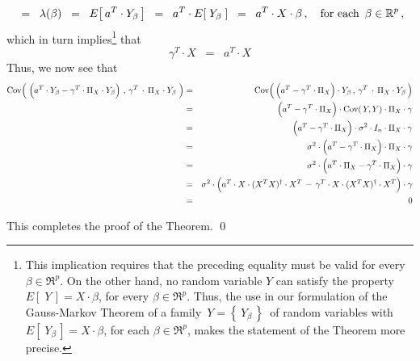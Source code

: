 \begin{enumerate}
\begin{equation*}
	\;\; = \;\;
		\lambda(\beta)
	\;\; = \;\;
		E\!\left[\,a^{T} \cdot Y_{\beta}\,\right]
	\;\; = \;\;
		a^{T} \cdot E\!\left[\;Y_{\beta}\;\right]
	\;\; = \;\;
		a^{T} \cdot X \cdot \beta\,,
	\quad
	\textnormal{for each \,$\beta \in \Re^{p}$}\,,
	\end{equation*}
	which in turn implies{\color{red}\footnote{\color{red}This implication
	requires that the preceding equality must be valid
	for every $\beta \in \Re^{p}$.
	On the other hand, no random variable $Y$ can satisfy the property
	$E\!\left[\;Y\,\right] = X \cdot \beta$, for every $\beta \in \Re^{p}$.
	Thus, the use in our formulation of the Gauss-Markov Theorem
	of a family \,$Y = \left\{\,Y_{\beta}\,\right\}$\, of random variables
	with $E\!\left[\;Y_{\beta}\,\right] = X \cdot \beta$, for each $\beta \in \Re^{p}$,
	makes the statement of the Theorem more precise.}}
	that
	\begin{equation*}
	\gamma^{T} \cdot X
	\;\; = \;\;
		a^{T} \cdot X
	\end{equation*}
	Thus, we now see that
	\begin{eqnarray*}
	\Cov\!\left(\;
		\left(a^{T} \cdot Y_{\beta}
		\overset{{\color{white}.}}{-}
		\gamma^{T} \cdot \Pi_{X} \cdot Y_{\beta}\right)
		\,,\,
		\gamma^{T} \overset{{\color{white}+}}{\cdot} \Pi_{X} \cdot Y_{\beta}
		\;\right)
	&=&
		\Cov\!\left(\,
			\left(a^{T} \overset{{\color{white}.}}{-} \gamma^{T} \cdot \Pi_{X} \right) \cdot Y_{\beta}
			\,,\,
			\gamma^{T} \overset{{\color{white}+}}{\cdot} \Pi_{X} \cdot Y_{\beta}
			\,\right)
	\\
	&=&
		\left(a^{T} \overset{{\color{white}.}}{-} \gamma^{T} \cdot \Pi_{X} \right)
		\cdot \Cov\!\left(\,Y,Y\right) \cdot \Pi_{X} \cdot \gamma
	\\
	&=&
		\left(a^{T} \overset{{\color{white}.}}{-} \gamma^{T} \cdot \Pi_{X} \right)
		\cdot \sigma^{2} \cdot I_{n} \cdot \Pi_{X} \cdot \gamma
	\\
	&=&
		\sigma^{2}
		\cdot
		\left(a^{T} \overset{{\color{white}.}}{-} \gamma^{T} \cdot \Pi_{X} \right)
		\cdot \Pi_{X} \cdot \gamma
	\\
	&=&
		\sigma^{2}
		\cdot
		\left(a^{T} \cdot \Pi_{X} \overset{{\color{white}.}}{-} \gamma^{T} \cdot \Pi_{X} \right)
		\cdot \gamma
	\\
	&=&
		\sigma^{2}
		\cdot
		\left(a^{T} \cdot X\cdot(X^{T}X)^{\dagger}\cdot X^{T}
		\,\overset{{\color{white}.}}{-}\,
		\gamma^{T} \cdot X\cdot(X^{T}X)^{\dagger}\cdot X^{T} \right)
		\cdot \gamma
	\\
	&=&
		0
	\end{eqnarray*}
\end{enumerate}
This completes the proof of the Theorem.
\qed


